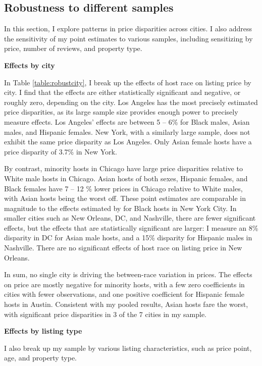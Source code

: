 \subsection*{Robustness to  different samples}

In this section, I explore patterns in price disparities across cities. I also address the sensitivity of my point estimates to various samples, including sensitizing by price, number of reviews, and property type.

\textbf{Effects by city}

In Table \ref{table:robustcity}, I break up the effects of host race on listing price by city. I find that the effects are either statistically significant and negative, or roughly zero, depending on the city. Los Angeles has the most precisely estimated price disparities, as its large sample size provides enough power to precisely measure effects. Los Angeles' effects are between 5 -- 6\% for Black males, Asian males, and Hispanic females. New York, with a similarly large sample, does not exhibit the same price disparity as Los Angeles. Only Asian female hosts have a price disparity of 3.7\% in New York. 

By contrast, minority hosts in Chicago have large price disparities relative to White male hosts in Chicago. Asian hosts of both sexes, Hispanic females, and Black females have 7 -- 12 \% lower prices in Chicago relative to White males, with Asian hosts being the worst off. These point estimates are comparable in magnitude to the effects estimated by \cite{edelman} for Black hosts in New York City. In smaller cities such as New Orleans, DC, and Nashville, there are fewer significant effects, but the effects that are statistically significant are larger: I measure an 8\% disparity in DC for Asian male hosts, and a 15\% disparity for Hispanic males in Nashville. There are no significant effects of host race on listing price in New Orleans.  

In sum, no single city is driving the between-race variation in prices. The effects on price are mostly negative for minority hosts, with a few zero coefficients in cities with fewer observations, and one positive coefficient for Hispanic female hosts in Austin. Consistent with my pooled results, Asian hosts fare the worst, with significant price disparities in 3 of the 7 cities in my sample. 


\textbf{Effects by listing type}

I also break up my sample by various listing characteristics, such as price point, age, and property type.

